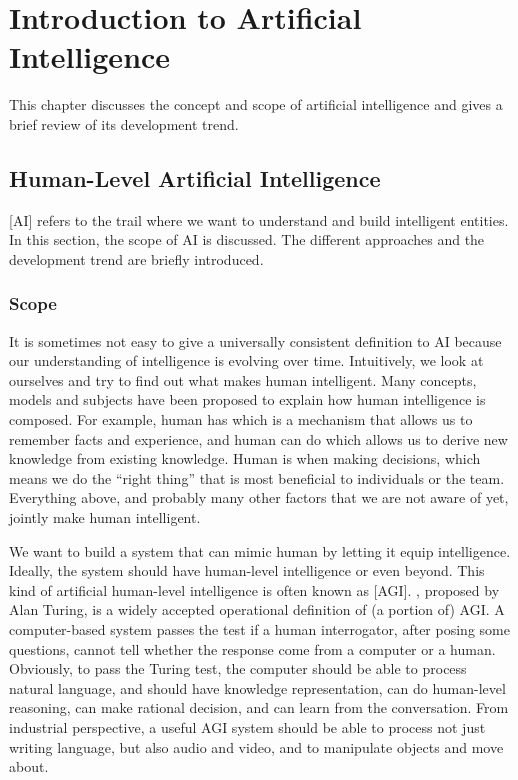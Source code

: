 \chapter{Introduction to Artificial Intelligence}

This chapter discusses the concept and scope of artificial intelligence and gives a brief review of its development trend.

\section{Human-Level Artificial Intelligence}

[AI] refers to the trail where we want to understand and build intelligent entities. In this section, the scope of AI is discussed. The different approaches and the development trend are briefly introduced.

\subsection{Scope}

It is sometimes not easy to give a universally consistent definition to AI because our understanding of intelligence is evolving over time. Intuitively, we look at ourselves and try to find out what makes human intelligent. Many concepts, models and subjects have been proposed to explain how human intelligence is composed. For example, human has  which is a mechanism that allows us to remember facts and experience, and human can do  which allows us to derive new knowledge from existing knowledge. Human is  when making decisions, which means we do the ``right thing'' that is most beneficial to individuals or the team. Everything above, and probably many other factors that we are not aware of yet, jointly make human intelligent.

We want to build a system that can mimic human by letting it equip intelligence. Ideally, the system should have human-level intelligence or even beyond. This kind of artificial human-level intelligence is often known as [AGI]. , proposed by Alan Turing, is a widely accepted operational definition of (a portion of) AGI. A computer-based system passes the test if a human interrogator, after posing some questions, cannot tell whether the response come from a computer or a human. Obviously, to pass the Turing test, the computer should be able to process natural language, and should have knowledge representation, can do human-level reasoning, can make rational decision, and can learn from the conversation. From industrial perspective, a useful AGI system should be able to process not just writing language, but also audio and video, and to manipulate objects and move about.

